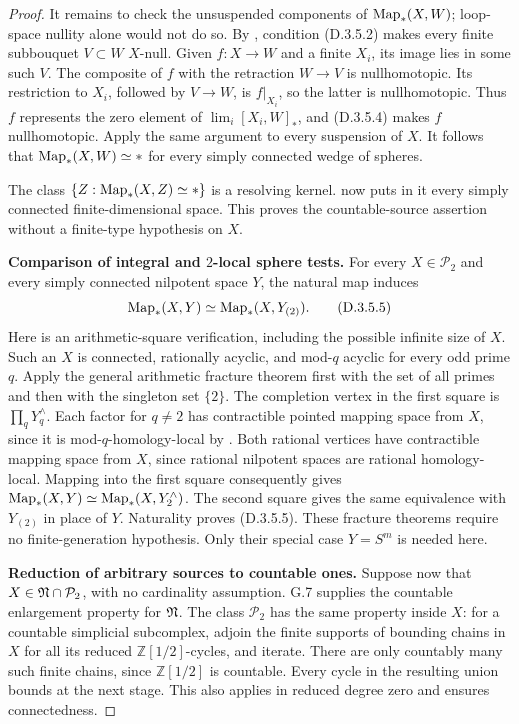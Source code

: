 \begin{proof}
It remains to check the unsuspended components of
$\operatorname{Map}_*(X,W)$; loop-space nullity alone would not do so.
By \cite[Corollary~12(a)]{I_Strom2012}, condition
(D.3.5.2) makes every finite subbouquet $V\subset W$
$X$-null. Given $f:X\to W$ and a finite $X_i$, its image
lies in some such $V$. The composite of $f$ with the
retraction $W\to V$ is nullhomotopic. Its restriction to
$X_i$, followed by $V\to W$, is $f|_{X_i}$, so the latter
is nullhomotopic. Thus $f$ represents the zero element of
$\lim_i[X_i,W]_*$, and (D.3.5.4) makes $f$ nullhomotopic.
Apply the same argument to every suspension of $X$.
It follows that $\operatorname{Map}_*(X,W)\simeq *$ for every simply
connected wedge of spheres.

The class $\{Z:\operatorname{Map}_*(X,Z)\simeq *\}$ is a resolving
kernel. \cite[Corollary~12(b)]{I_Strom2012} now puts in
it every simply connected finite-dimensional space.
This proves the countable-source assertion without a
finite-type hypothesis on $X$.

\medskip\noindent
\textbf{Comparison of integral and $2$-local sphere tests.}
For every $X\in\mathcal P_2$ and every simply connected
nilpotent space $Y$, the natural map induces
\[
        \operatorname{Map}_*(X,Y)\simeq\operatorname{Map}_*(X,Y_{(2)}).
 \tag{D.3.5.5}
\]
Here is an arithmetic-square verification, including the
possible infinite size of $X$. Such an $X$ is connected,
rationally acyclic, and mod-$q$ acyclic for every odd
prime $q$. Apply the general arithmetic fracture theorem
\cite[Theorem~13.1.4]{FGHMayPonto2012} first with the set
of all primes and then with the singleton set $\{2\}$.
The completion vertex in the first square is
$\prod_qY_q^{\wedge}$. Each factor for $q\ne2$ has
contractible pointed mapping space from $X$, since it is
mod-$q$-homology-local by
\cite[Theorems~11.1.1--11.1.2]{FGHMayPonto2012}.
Both rational vertices have contractible mapping space
from $X$, since rational nilpotent spaces are rational
homology-local. Mapping into the first square consequently
gives $\operatorname{Map}_*(X,Y)\simeq\operatorname{Map}_*(X,Y_2^{\wedge})$.
The second square gives the same equivalence with
$Y_{(2)}$ in place of $Y$. Naturality proves (D.3.5.5).
These fracture theorems require no finite-generation
hypothesis. Only their special case $Y=S^m$ is needed here.

\medskip\noindent
\textbf{Reduction of arbitrary sources to countable ones.}
Suppose now that $X\in\mathfrak N\cap\mathcal P_2$, with no
cardinality assumption. G.7 supplies the countable
enlargement property for $\mathfrak N$. The class $\mathcal P_2$
has the same property inside $X$: for a countable
simplicial subcomplex, adjoin the finite supports of
bounding chains in $X$ for all its reduced
$\mathbb Z[1/2]$-cycles, and iterate. There are only
countably many such finite chains, since
$\mathbb Z[1/2]$ is countable. Every cycle in the resulting
union bounds at the next stage. This also applies in
reduced degree zero and ensures connectedness.


\end{proof}
